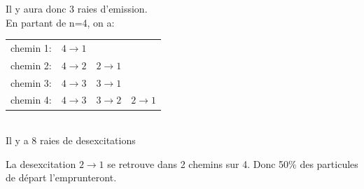\documentclass[12pt,french,dvips]{report}
\begin{document}
Il y aura donc 3 raies d'emission.\\
En partant de n=4, on a:\\
\begin{tabular}{llll}
chemin 1: & $4\rightarrow 1$ \\
chemin 2: & $4\rightarrow 2$ & $2\rightarrow 1$ \\
chemin 3: & $4\rightarrow 3$ & $3\rightarrow 1$ \\
chemin 4: & $4\rightarrow 3$ & $3\rightarrow 2$ & $2\rightarrow 1$ \\
\end{tabular}\\
Il y a 8 raies de desexcitations
\item La desexcitation $2\rightarrow 1$ se retrouve dans 2 chemins sur 4.
Donc 50\% des particules de départ l'emprunteront.
\end{document}
